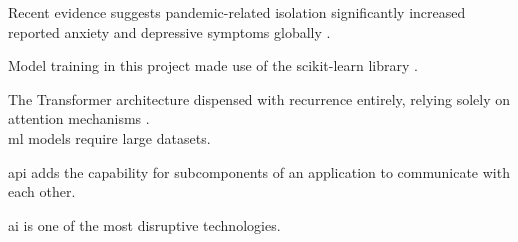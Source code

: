 Recent evidence suggests pandemic-related isolation significantly increased
reported anxiety and depressive symptoms globally \citep{who2023}.

Model training in this project made use of the scikit-learn library
\citep{pedregosa2011}.

The Transformer architecture dispensed with recurrence entirely, relying
solely on attention mechanisms \citep{vaswani2017}. \\

\Gls{ml} models require large datasets.

\Gls{api} adds the capability for subcomponents of an application to communicate with each other.

\Gls{ai} is one of the most disruptive technologies.

